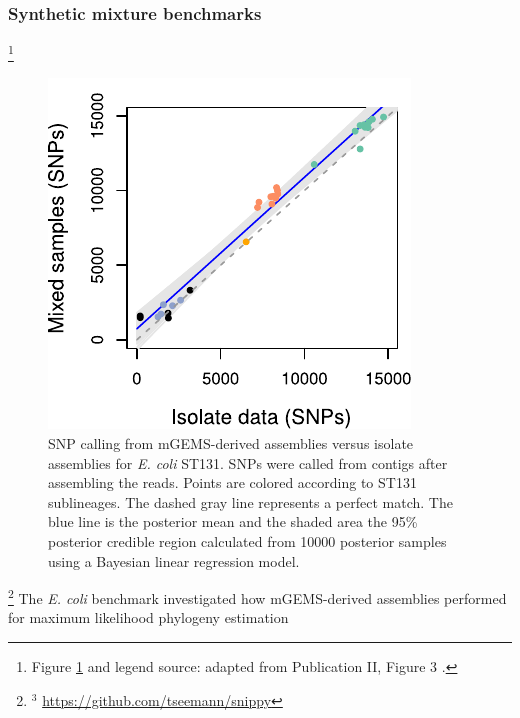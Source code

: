 \documentclass[officiallayout]{tktla}
\let\svthefootnote\thefootnote
\begin{document}
\subsubsection{Synthetic mixture benchmarks}

\noindent\let\thefootnote\relax\footnote{Figure \ref{fig:mgems-ecoli-snps} and legend source: adapted from Publication II, Figure 3 \citep{maklin_bacterial_2021}.}
\addtocounter{footnote}{-1}\let\thefootnote\svthefootnote
\begin{figure}[!b]
    \centering
    \includegraphics[height=0.33\textheight,width=\textwidth,keepaspectratio]{img/reproduced/MGen2021_mGEMS_Figure_3a.pdf}
    \caption{SNP calling from mGEMS-derived assemblies versus isolate
      assemblies for \textit{E. coli} ST131. SNPs were called from
      contigs after assembling the reads. Points are colored according
      to ST131 sublineages. The dashed gray line represents a perfect
      match. The blue line is the posterior mean and the shaded area
      the 95\% posterior credible region calculated from 10000
      posterior samples using a Bayesian linear regression model.}
  \label{fig:mgems-ecoli-snps}
\end{figure}
\noindent\let\thefootnote\relax\footnote{$^{3}$ \url{https://github.com/tseemann/snippy}}
The \textit{E. coli} benchmark investigated how mGEMS-derived
assemblies performed for maximum likelihood phylogeny estimation
\end{document}
